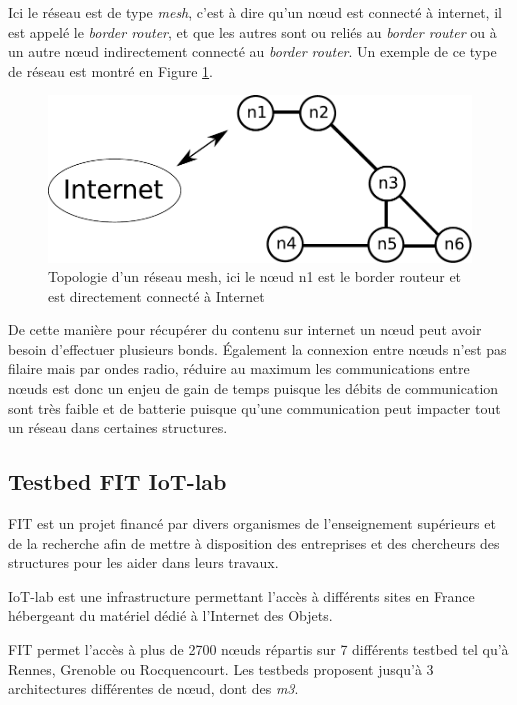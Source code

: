Ici le réseau est de type \emph{mesh}, c'est à dire qu'un nœud est connecté à internet, il est appelé le \emph{border router}, et que les autres sont ou reliés au \emph{border router} ou à un autre nœud indirectement connecté au \emph{border router}. Un exemple de ce type de réseau est montré en Figure \ref{mesh-network}.

\begin{figure}[ht!]
\centering
\includegraphics[scale=0.6]{images/mesh.pdf}
\caption{Topologie d'un réseau mesh, ici le nœud n1 est le border routeur et est directement connecté à Internet}
\label{mesh-network}
\end{figure}

De cette manière pour récupérer du contenu sur internet un nœud peut avoir besoin d'effectuer plusieurs bonds. Également la connexion entre nœuds n'est pas filaire mais par ondes radio, réduire au maximum les communications entre nœuds est donc un enjeu de gain de temps puisque les débits de communication sont très faible et de batterie puisque qu'une communication peut impacter tout un réseau dans certaines structures.

\subsection{Testbed FIT IoT-lab}

FIT est un projet financé par divers organismes de l'enseignement supérieurs et de la recherche afin de mettre à disposition des entreprises et des chercheurs des structures pour les aider dans leurs travaux.

IoT-lab\cite{iot-lab} est une infrastructure permettant l'accès à différents sites en France hébergeant du matériel dédié à l'Internet des Objets.

FIT permet l'accès à plus de 2700 nœuds répartis sur 7 différents testbed tel qu'à Rennes, Grenoble ou Rocquencourt. Les testbeds proposent jusqu'à 3 architectures différentes de nœud, dont des \emph{m3}.

